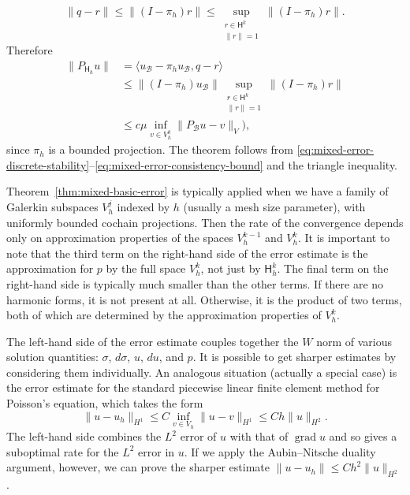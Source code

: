 \begin{Proof}
\[
\|q-r\|\leq\|(I-\pi_h)r\|\leq\sup_{\substack{r\in\mathsf H^k\\\|r\|=1}}\|(I-\pi_h)r\|.
\]
{Therefore}
\begin{equation}\label{eq:mixed-error-consistency-bound}
\begin{aligned}
\|P_{\mathsf H_h}u\|&=\langle u_{\mathcal B}-\pi_hu_{\mathcal B},q-r\rangle\\
&\leq\|(I-\pi_h)u_{\mathcal B}\|\sup_{\substack{r\in\mathsf H^k\\\|r\|=1}}\|(I-\pi_h)r\|\\
&\leq c\mu\inf_{v\in V_h^k}\|P_{\mathcal B}u-v\|_V),
\end{aligned}
\end{equation}
{since $\pi_h$ is a bounded projection. The theorem follows from \eqref{eq:mixed-error-discrete-stability}--\eqref{eq:mixed-error-consistency-bound} and the triangle inequality.}
\end{Proof}

{Theorem~\ref{thm:mixed-basic-error} is typically applied when we have a family of Galerkin subspaces $V_h^j$ indexed by $h$ (usually a mesh size parameter), with uniformly bounded cochain projections. Then the rate of the convergence depends only on approximation properties of the spaces $V_h^{k-1}$ and $V_h^k$. It is important to note that the third term on the right-hand side of the error estimate is the approximation for $p$ by the full space $V_h^k$, not just by $\mathsf H_h^k$. The final term on the right-hand side is typically much smaller than the other terms. If there are no harmonic forms, it is not present at all. Otherwise, it is the product of two terms, both of which are determined by the approximation properties of $V_h^k$.}

{The left-hand side of the error estimate couples together the $W$ norm of various solution quantities: $\sigma$, $d\sigma$, $u$, $du$, and $p$. It is possible to get sharper estimates by considering them individually. An analogous situation (actually a special case) is the error estimate for the standard piecewise linear finite element method for Poisson's equation, which takes the form}
\[
\|u-u_h\|_{H^1}\leq C\inf_{v\in V_h}\|u-v\|_{H^1}\leq Ch\|u\|_{H^2}.
\]
{The left-hand side combines the $L^2$ error of $u$ with that of $\operatorname{grad}u$ and so gives a suboptimal rate for the $L^2$ error in $u$. If we apply the Aubin–Nitsche duality argument, however, we can prove the sharper estimate $\|u-u_h\|\leq Ch^2\|u\|_{H^2}$.}

